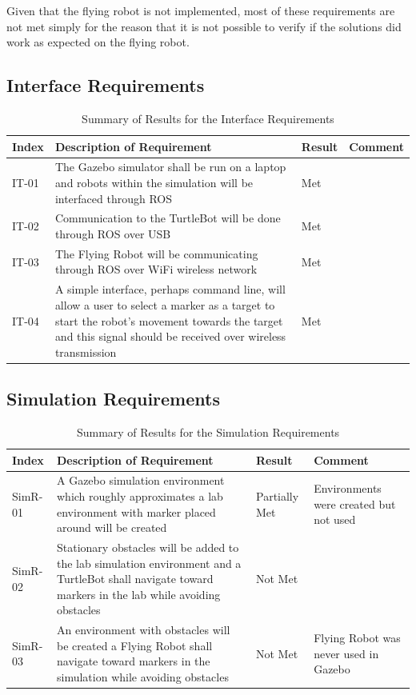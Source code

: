 \documentclass{article}[12]
\begin{document}
Given that the flying robot is not implemented, most of these requirements are not met simply for the reason that it is not possible to verify if the solutions did work as expected on the flying robot.

 \subsection{Interface Requirements}

	\begin{table}[H]
  \small
		\begin{tabular}{p{2cm} p{8cm} p{2cm} p{3cm}}
			\hline
			{\textbf{Index}} & {\textbf{Description of Requirement}} & {\textbf{Result}} & {\textbf{Comment}} \\ \hline
IT-01 & The Gazebo simulator shall be run on a laptop and robots within the simulation will be interfaced through ROS & Met & \\
IT-02 & Communication to the TurtleBot will be done through ROS over USB & Met & \\
IT-03 & The Flying Robot will be communicating through ROS over WiFi wireless network & Met &\\
IT-04 & A simple interface, perhaps command line, will allow a user to select a marker as a target to start the robot's movement towards the target and this signal should be received over wireless transmission & Met & \\ \hline
		\end{tabular}
		\caption{Summary of Results for the Interface Requirements}
		\label{table:interresults}
 \end{table}
 
 \subsection{Simulation Requirements}

	\begin{table}[H]
  \small
		\begin{tabular}{p{2cm} p{8cm} p{2cm} p{3cm}}
			\hline
			{\textbf{Index}} & {\textbf{Description of Requirement}} & {\textbf{Result}} & {\textbf{Comment}} \\ \hline
SimR-01 & A Gazebo simulation environment which roughly approximates a lab environment with marker placed around will be created & Partially Met & Environments were created but not used\\
SimR-02 & Stationary obstacles will be added to the lab simulation environment and a TurtleBot shall navigate toward markers in the lab while avoiding obstacles & Not Met & \\
SimR-03 & An environment with obstacles will be created a Flying Robot shall navigate toward markers in the simulation while avoiding obstacles & Not Met & Flying Robot was never used in Gazebo \\ \hline
		\end{tabular}
		\caption{Summary of Results for the Simulation Requirements}
		\label{table:simresults}
 \end{table}
\end{document}
